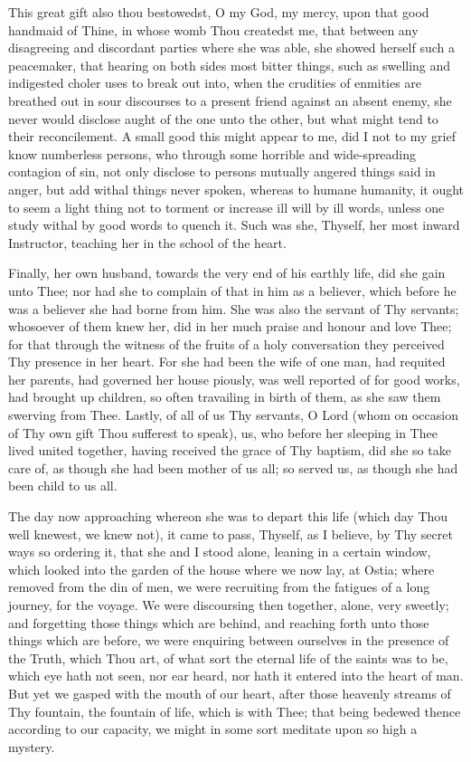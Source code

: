 \documentclass[b5paper,openright,12pt,twoside]{book}
\begin{document}
This great gift also thou bestowedst, O my God, my mercy, upon that good
handmaid of Thine, in whose womb Thou createdst me, that between any
disagreeing and discordant parties where she was able, she showed
herself such a peacemaker, that hearing on both sides most bitter
things, such as swelling and indigested choler uses to break out into,
when the crudities of enmities are breathed out in sour discourses to a
present friend against an absent enemy, she never would disclose aught
of the one unto the other, but what might tend to their reconcilement.
A small good this might appear to me, did I not to my grief know
numberless persons, who through some horrible and wide-spreading
contagion of sin, not only disclose to persons mutually angered things
said in anger, but add withal things never spoken, whereas to humane
humanity, it ought to seem a light thing not to torment or increase ill
will by ill words, unless one study withal by good words to quench it.
Such was she, Thyself, her most inward Instructor, teaching her in the
school of the heart.

Finally, her own husband, towards the very end of his earthly life,
did she gain unto Thee; nor had she to complain of that in him as a
believer, which before he was a believer she had borne from him. She was
also the servant of Thy servants; whosoever of them knew her, did in her
much praise and honour and love Thee; for that through the witness of
the fruits of a holy conversation they perceived Thy presence in her
heart. For she had been the wife of one man, had requited her parents,
had governed her house piously, was well reported of for good works, had
brought up children, so often travailing in birth of them, as she saw
them swerving from Thee. Lastly, of all of us Thy servants, O Lord (whom
on occasion of Thy own gift Thou sufferest to speak), us, who before her
sleeping in Thee lived united together, having received the grace of Thy
baptism, did she so take care of, as though she had been mother of us
all; so served us, as though she had been child to us all.

The day now approaching whereon she was to depart this life (which day
Thou well knewest, we knew not), it came to pass, Thyself, as I believe,
by Thy secret ways so ordering it, that she and I stood alone, leaning
in a certain window, which looked into the garden of the house where we
now lay, at Ostia; where removed from the din of men, we were recruiting
from the fatigues of a long journey, for the voyage. We were discoursing
then together, alone, very sweetly; and forgetting those things which
are behind, and reaching forth unto those things which are before, we
were enquiring between ourselves in the presence of the Truth, which
Thou art, of what sort the eternal life of the saints was to be, which
eye hath not seen, nor ear heard, nor hath it entered into the heart of
man. But yet we gasped with the mouth of our heart, after those heavenly
streams of Thy fountain, the fountain of life, which is with Thee; that
being bedewed thence according to our capacity, we might in some sort
meditate upon so high a mystery.
\end{document}
